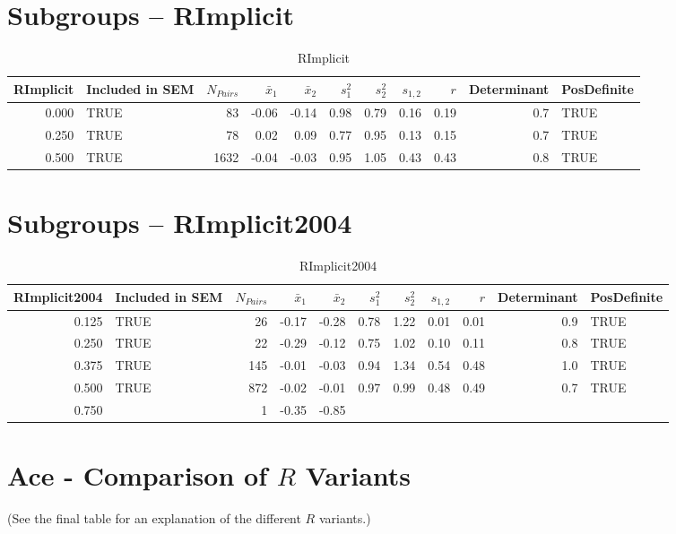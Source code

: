 \documentclass{article}\usepackage[]{graphicx}\usepackage[]{color}
\begin{document}
\section{Subgroups --  RImplicit }%
\begin{table}[ht]
\centering
\begin{tabular}{rlrrrrrrrrl}
  \hline
RImplicit & Included in SEM & $N_{Pairs}$ & $\bar{x}_1$ & $\bar{x}_2$ & $s_1^2$ & $s_2^2$ & $s_{1,2}$ & $r$ & Determinant & PosDefinite \\ 
  \hline
0.000 & TRUE & 83 & -0.06 & -0.14 & 0.98 & 0.79 & 0.16 & 0.19 & 0.7 & TRUE \\ 
  0.250 & TRUE & 78 & 0.02 & 0.09 & 0.77 & 0.95 & 0.13 & 0.15 & 0.7 & TRUE \\ 
  0.500 & TRUE & 1632 & -0.04 & -0.03 & 0.95 & 1.05 & 0.43 & 0.43 & 0.8 & TRUE \\ 
   \hline
\end{tabular}
\caption{RImplicit} 
\end{table}
\section{Subgroups --  RImplicit2004 }%
\begin{table}[ht]
\centering
\begin{tabular}{rlrrrrrrrrl}
  \hline
RImplicit2004 & Included in SEM & $N_{Pairs}$ & $\bar{x}_1$ & $\bar{x}_2$ & $s_1^2$ & $s_2^2$ & $s_{1,2}$ & $r$ & Determinant & PosDefinite \\ 
  \hline
0.125 & TRUE & 26 & -0.17 & -0.28 & 0.78 & 1.22 & 0.01 & 0.01 & 0.9 & TRUE \\ 
  0.250 & TRUE & 22 & -0.29 & -0.12 & 0.75 & 1.02 & 0.10 & 0.11 & 0.8 & TRUE \\ 
  0.375 & TRUE & 145 & -0.01 & -0.03 & 0.94 & 1.34 & 0.54 & 0.48 & 1.0 & TRUE \\ 
  0.500 & TRUE & 872 & -0.02 & -0.01 & 0.97 & 0.99 & 0.48 & 0.49 & 0.7 & TRUE \\ 
  0.750 &  & 1 & -0.35 & -0.85 &  &  &  &  &  &  \\ 
   \hline
\end{tabular}
\caption{RImplicit2004} 
\end{table}


\section{Ace - Comparison of $R$ Variants} 
(See the final table for an explanation of the different $R$ variants.)
\end{document}
